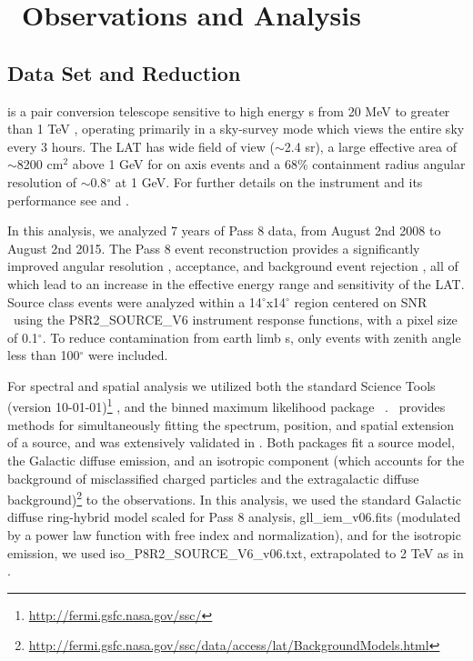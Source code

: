 \section{\label{sec:LATobs}\FermiLat ~Observations and  Analysis }
\subsection{\label{sec:LATdata}Data Set and Reduction}
\FermiLat is a pair conversion telescope sensitive to high energy \gam s  from 20 MeV to greater than 1 TeV \citep{2FHL}, operating primarily in a sky-survey mode which views  the entire sky every 3 hours. The LAT has wide field of view ($\sim$2.4 sr), a large effective area of $\sim$8200 cm$^2$ above 1 GeV for on axis events and a  68\% containment radius angular resolution  of $\sim$0.8$^\circ$  at 1 GeV. For further details  on the instrument and its performance see \cite{atwood09} and \cite{lat_perf}.

In this analysis, we  analyzed 7 years of Pass 8 data, from August 2nd 2008  to August 2nd 2015. The Pass 8 event reconstruction provides a significantly improved angular resolution , acceptance, and background event rejection \citep{atwood13b,atwood13}, all of which lead to an increase in the effective energy range and sensitivity of the LAT. Source class events were analyzed within a 14$^\circ$x14$^\circ$ region centered on SNR \Gone~using the P8R2\_SOURCE\_V6 instrument response functions, with a pixel size of 0.1$^{\circ}$. To reduce contamination from earth limb \gam s, only events with zenith angle less than 100$^{\circ}$ were included.

For spectral and spatial analysis we utilized both the standard \Fermi Science Tools (version 10-01-01)\footnote[1]{\url{http://fermi.gsfc.nasa.gov/ssc/}} , and the binned maximum likelihood package \ptlike~\citep{Kerr10}. \ptlike~provides methods for simultaneously fitting the spectrum, position, and spatial extension of a source, and was extensively validated in \cite{Lande12}. Both packages fit a source model, the Galactic diffuse emission, and an isotropic component (which accounts for the background of misclassified charged particles and the extragalactic diffuse \gam~ background)\footnote[2]{\url{http://fermi.gsfc.nasa.gov/ssc/data/access/lat/BackgroundModels.html}} to the observations. In this analysis, we used the standard Galactic diffuse ring-hybrid model scaled for Pass 8 analysis, gll{\_}iem{\_}v06.fits (modulated by a power law function with free index and normalization), and for the isotropic emission,  we used iso{\_}P8R2{\_}SOURCE{\_}V6{\_}v06.txt, extrapolated to 2 TeV as in \cite{2FHL}.

